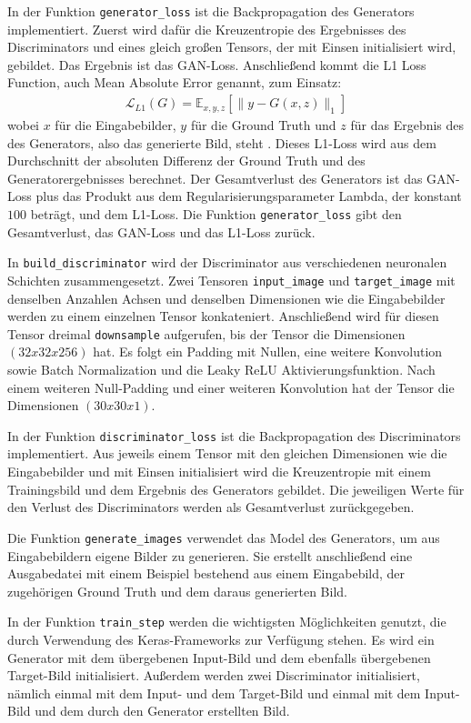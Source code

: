 In der Funktion \lstinline|generator_loss| ist die Backpropagation des Generators implementiert. Zuerst wird dafür die Kreuzentropie des Ergebnisses des Discriminators und eines gleich großen Tensors, der mit Einsen initialisiert wird, gebildet. Das Ergebnis ist das GAN-Loss. Anschließend kommt die L1 Loss Function, auch Mean Absolute Error genannt, zum Einsatz:
\begin{align}
  \mathcal{L} _{L1}(G) = \mathbb{E}_{x,y,z}[\|y - G(x,z)\|_1]
\end{align}
wobei $x$ für die Eingabebilder, $y$ für die Ground Truth und $z$ für das Ergebnis des des Generators, also das generierte Bild, steht \cite{isola2018imagetoimage}. Dieses L1-Loss wird aus dem Durchschnitt der absoluten Differenz der Ground Truth und des Generatorergebnisses berechnet. Der Gesamtverlust des Generators ist das GAN-Loss plus das Produkt aus dem Regularisierungsparameter Lambda, der konstant $100$ beträgt, und dem L1-Loss. Die Funktion \lstinline|generator_loss| gibt den Gesamtverlust, das GAN-Loss und das L1-Loss zurück.

In \lstinline|build_discriminator| wird der Discriminator aus verschiedenen neuronalen Schichten zusammengesetzt. Zwei Tensoren \lstinline|input_image| und \lstinline|target_image| mit denselben Anzahlen Achsen und denselben Dimensionen wie die Eingabebilder werden zu einem einzelnen Tensor konkateniert. Anschließend wird für diesen Tensor dreimal \lstinline|downsample| aufgerufen, bis der Tensor die Dimensionen $(32x32x256)$ hat. Es folgt ein Padding mit Nullen, eine weitere Konvolution sowie Batch Normalization und die Leaky ReLU Aktivierungsfunktion. Nach einem weiteren Null-Padding und einer weiteren Konvolution hat der Tensor die Dimensionen $(30x30x1)$.

In der Funktion \lstinline|discriminator_loss| ist die Backpropagation des Discriminators implementiert. Aus jeweils einem Tensor mit den gleichen Dimensionen wie die Eingabebilder und mit Einsen initialisiert wird die Kreuzentropie mit einem Trainingsbild und dem Ergebnis des Generators gebildet. Die jeweiligen Werte für den Verlust des Discriminators werden als Gesamtverlust zurückgegeben.

Die Funktion \lstinline|generate_images| verwendet das Model des Generators, um aus Eingabebildern eigene Bilder zu generieren. Sie erstellt anschließend eine Ausgabedatei mit einem Beispiel bestehend aus einem Eingabebild, der zugehörigen Ground Truth und dem daraus generierten Bild.

In der Funktion \lstinline|train_step| werden die wichtigsten Möglichkeiten genutzt, die durch Verwendung des Keras-Frameworks zur Verfügung stehen. Es wird ein Generator mit dem übergebenen Input-Bild und dem ebenfalls übergebenen Target-Bild initialisiert. Außerdem werden zwei Discriminator initialisiert, nämlich einmal mit dem Input- und dem Target-Bild und einmal mit dem Input-Bild und dem durch den Generator erstellten Bild.

